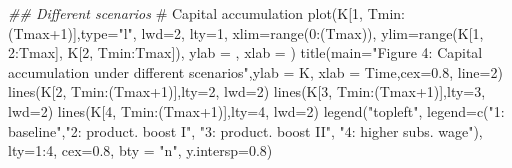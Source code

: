 \documentclass[
  letterpaper,
  DIV=11,
  numbers=noendperiod]{scrreprt}
\newenvironment{Shaded}{\begin{snugshade}}{\end{snugshade}}
\newcommand{\AttributeTok}[1]{\textcolor[rgb]{0.40,0.45,0.13}{#1}}
\newcommand{\CommentTok}[1]{\textcolor[rgb]{0.37,0.37,0.37}{#1}}
\newcommand{\DecValTok}[1]{\textcolor[rgb]{0.68,0.00,0.00}{#1}}
\newcommand{\DocumentationTok}[1]{\textcolor[rgb]{0.37,0.37,0.37}{\textit{#1}}}
\newcommand{\FloatTok}[1]{\textcolor[rgb]{0.68,0.00,0.00}{#1}}
\newcommand{\FunctionTok}[1]{\textcolor[rgb]{0.28,0.35,0.67}{#1}}
\newcommand{\NormalTok}[1]{\textcolor[rgb]{0.00,0.23,0.31}{#1}}
\newcommand{\SpecialCharTok}[1]{\textcolor[rgb]{0.37,0.37,0.37}{#1}}
\newcommand{\StringTok}[1]{\textcolor[rgb]{0.13,0.47,0.30}{#1}}
\begin{document}
\begin{Shaded}
\begin{Highlighting}[]
\DocumentationTok{\#\# Different scenarios}
\CommentTok{\# Capital accumulation}
\FunctionTok{plot}\NormalTok{(K[}\DecValTok{1}\NormalTok{, Tmin}\SpecialCharTok{:}\NormalTok{(Tmax}\SpecialCharTok{+}\DecValTok{1}\NormalTok{)],}\AttributeTok{type=}\StringTok{"l"}\NormalTok{, }\AttributeTok{lwd=}\DecValTok{2}\NormalTok{, }\AttributeTok{lty=}\DecValTok{1}\NormalTok{, }\AttributeTok{xlim=}\FunctionTok{range}\NormalTok{(}\DecValTok{0}\SpecialCharTok{:}\NormalTok{(Tmax)), }\AttributeTok{ylim=}\FunctionTok{range}\NormalTok{(K[}\DecValTok{1}\NormalTok{, }\DecValTok{2}\SpecialCharTok{:}\NormalTok{Tmax], K[}\DecValTok{2}\NormalTok{, Tmin}\SpecialCharTok{:}\NormalTok{Tmax]), }\AttributeTok{ylab =} \StringTok{\textquotesingle{}\textquotesingle{}}\NormalTok{, }\AttributeTok{xlab =} \StringTok{\textquotesingle{}\textquotesingle{}}\NormalTok{)}
\FunctionTok{title}\NormalTok{(}\AttributeTok{main=}\StringTok{"Figure 4: Capital accumulation under different scenarios"}\NormalTok{,}\AttributeTok{ylab =} \StringTok{\textquotesingle{}K\textquotesingle{}}\NormalTok{, }\AttributeTok{xlab =} \StringTok{\textquotesingle{}Time\textquotesingle{}}\NormalTok{,}\AttributeTok{cex=}\FloatTok{0.8}\NormalTok{, }\AttributeTok{line=}\DecValTok{2}\NormalTok{)}
\FunctionTok{lines}\NormalTok{(K[}\DecValTok{2}\NormalTok{, Tmin}\SpecialCharTok{:}\NormalTok{(Tmax}\SpecialCharTok{+}\DecValTok{1}\NormalTok{)],}\AttributeTok{lty=}\DecValTok{2}\NormalTok{, }\AttributeTok{lwd=}\DecValTok{2}\NormalTok{)}
\FunctionTok{lines}\NormalTok{(K[}\DecValTok{3}\NormalTok{, Tmin}\SpecialCharTok{:}\NormalTok{(Tmax}\SpecialCharTok{+}\DecValTok{1}\NormalTok{)],}\AttributeTok{lty=}\DecValTok{3}\NormalTok{, }\AttributeTok{lwd=}\DecValTok{2}\NormalTok{)}
\FunctionTok{lines}\NormalTok{(K[}\DecValTok{4}\NormalTok{, Tmin}\SpecialCharTok{:}\NormalTok{(Tmax}\SpecialCharTok{+}\DecValTok{1}\NormalTok{)],}\AttributeTok{lty=}\DecValTok{4}\NormalTok{, }\AttributeTok{lwd=}\DecValTok{2}\NormalTok{)}
\FunctionTok{legend}\NormalTok{(}\StringTok{"topleft"}\NormalTok{, }\AttributeTok{legend=}\FunctionTok{c}\NormalTok{(}\StringTok{"1: baseline"}\NormalTok{,}\StringTok{"2: product. boost I"}\NormalTok{, }\StringTok{"3: product. boost II"}\NormalTok{, }\StringTok{"4: higher subs. wage"}\NormalTok{), }\AttributeTok{lty=}\DecValTok{1}\SpecialCharTok{:}\DecValTok{4}\NormalTok{, }\AttributeTok{cex=}\FloatTok{0.8}\NormalTok{, }\AttributeTok{bty =} \StringTok{"n"}\NormalTok{, }\AttributeTok{y.intersp=}\FloatTok{0.8}\NormalTok{)}
\end{Highlighting}
\end{Shaded}
\end{document}
